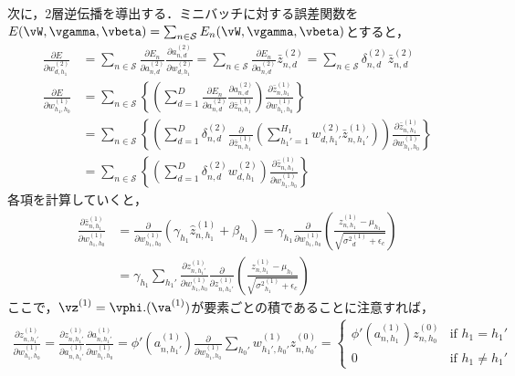 次に，2層逆伝播を導出する．ミニバッチに対する誤差関数を$E(\vW,\vgamma,\vbeta)= \sum_{n\in\mathcal{S}}E_n(\vW,\vgamma,\vbeta)$とすると，
\begin{align*}
 \frac{\partial E}{\partial w^{(2)}_{d,h_1}}
 &=
 \sum_{n\in\mathcal{S}}\frac{\partial E_n}{\partial a^{(2)}_{n,d}} \frac{\partial a^{(2)}_{n,d}}{\partial w^{(2)}_{d,h_1}}
 =
 \sum_{n\in\mathcal{S}}\frac{\partial E_n}{\partial a^{(2)}_{n,d}} \bar{z}_{n,d}^{(2)}
 =
 \sum_{n\in\mathcal{S}} \delta^{(2)}_{n,d} \bar{z}_{n,d}^{(2)}
 \\
 \frac{\partial E}{\partial w^{(1)}_{h_1,h_0}}
 &=
 \sum_{n\in\mathcal{S}}
 \left\{
 \left(
 \sum_{d=1}^{D}
 \frac{\partial E_n}{\partial a^{(2)}_{n,d}}
 \frac{\partial a^{(2)}_{n,d}} {\partial \bar{z}^{(1)}_{n,h_1}}
 \right)
 \frac{\partial \bar{z}^{(1)}_{n,h_1}}{\partial w^{(1)}_{h_1,h_0}}
 \right\}
 \\
 &=
 \sum_{n\in\mathcal{S}}
 \left\{
 \left(
 \sum_{d=1}^{D}
 \delta^{(2)}_{n,d}
 \frac{\partial} {\partial \bar{z}^{(1)}_{n,h_1}}
 \left(
 \sum_{h_1'=1}^{H_1}w^{(2)}_{d,h_1'}\bar{z}^{(1)}_{n,h_1'}
 \right)
 \right)
 \frac{\partial \bar{z}^{(1)}_{n,h_1}}{\partial w^{(1)}_{h_1,h_0}}
 \right\}
 \\
 &=
 \sum_{n\in\mathcal{S}}
 \left\{
 \left(
 \sum_{d=1}^{D}
 \delta^{(2)}_{n,d}
 w^{(2)}_{d,h_1}
 \right)
 \frac{\partial \bar{z}^{(1)}_{n,h_1}}{\partial w^{(1)}_{h_1,h_0}}
 \right\}
\end{align*}
各項を計算していくと，
\begin{align*}
 \frac{\partial \bar{z}^{(1)}_{n,h_1}}{\partial w^{(1)}_{h_1,h_0}}
 &=
 \frac{\partial}{\partial w^{(1)}_{h_1,h_0}} (\gamma_{h_1} \hat{z}^{(1)}_{n,h_1} + \beta_{h_1})
 =
 \gamma_{h_1} \frac{\partial}{\partial w^{(1)}_{h_1,h_0}}
  \left( \frac{z^{(1)}_{n,h_1}-\mu_{h_1}}
 {\sqrt{{\sigma^2}^{(1)}_{d}+\epsilon_c}} \right)
 \\
 &=
 \gamma_{h_1} \sum_{h_1'}\frac{\partial z^{(1)}_{n,h_1'}}{\partial w^{(1)}_{h_1,h_0}}
  \frac{\partial }{\partial z^{(1)}_{n,h_1'}}
  \left( \frac{z^{(1)}_{n,h_1}-\mu_{h_1}}
 {\sqrt{{\sigma^2}^{(1)}_{h_1}+\epsilon_c}} \right)
\end{align*}
ここで，$\vz^{(1)}=\vphi.(\va^{(1)})$が要素ごとの積であることに注意すれば，
\begin{align*}
\frac{\partial z^{(1)}_{n,h_1'}}{\partial w^{(1)}_{h_1,h_0}}
=
\frac{\partial z^{(1)}_{n,h_1'}}{\partial a^{(1)}_{n,h_1'}}
\frac{\partial a^{(1)}_{n,h_1'}}{\partial w^{(1)}_{h_1,h_0}}
=
\phi'(a^{(1)}_{n,h_1'})
\frac{\partial}{\partial w^{(1)}_{h_1,h_0}}\sum_{h_0'} w^{(1)}_{h_1',h_0'}z^{(0)}_{n,h_0'}
=\left\{
    \begin{array}{ll}
      \phi'(a^{(1)}_{n,h_1})z^{(0)}_{n,h_0} & \mbox{if }h_1=h_1' \\
      0 & \mbox{if } h_1\neq h_1'
    \end{array}
  \right.
\end{align*}
